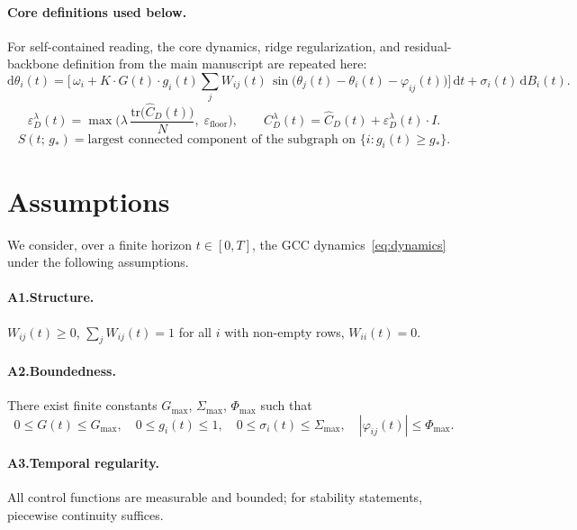 \documentclass[11pt,a4paper]{article}
\theoremstyle{plain}
\theoremstyle{definition}
\theoremstyle{remark}
\newcommand{\Gmax}{G_{\max}}
\begin{document}
\paragraph{Core definitions used below.}
For self-contained reading, the core dynamics, ridge regularization, and residual-backbone definition from the main manuscript are repeated here:
\begin{equation}
\label{eq:dynamics}
\mathrm{d}\theta_i(t)
= \biggl[\,\omega_i
+ K \cdot G(t) \cdot g_i(t) \sum_{j} W_{ij}(t)\,\sin\!\bigl(\theta_j(t) - \theta_i(t) - \varphi_{ij}(t)\bigr)
\biggr]\,\mathrm{d}t
+ \sigma_i(t)\,\mathrm{d}B_i(t).
\end{equation}
\begin{equation}
\label{eq:ridge}
\varepsilon_D^{\lambda}(t) =
\max\!\biggl(\lambda\,\frac{\mathrm{tr}\bigl(\hat{C}_D(t)\bigr)}{N},\;\varepsilon_{\mathrm{floor}}\biggr),
\qquad
C_D^{\lambda}(t) = \hat{C}_D(t) + \varepsilon_D^{\lambda}(t)\cdot I.
\end{equation}
\begin{equation}
\label{eq:backbone}
S(t;\,g_*) = \text{largest connected component of the subgraph on } \{i : g_i(t) \geq g_*\}.
\end{equation}


\section{Assumptions}
\label{app:voraussetzungen}

We consider, over a finite horizon $t \in [0,T]$, the GCC dynamics~\eqref{eq:dynamics} under the following assumptions.

\paragraph{A1.\;Structure.}
$W_{ij}(t) \geq 0$, \;\;$\sum_j W_{ij}(t) = 1$ for all $i$ with non-empty rows, \;\;$W_{ii}(t) = 0$.

\paragraph{A2.\;Boundedness.}
There exist finite constants $\Gmax$, $\Sigma_{\max}$, $\Phi_{\max}$ such that
\[
0 \leq G(t) \leq \Gmax, \quad
0 \leq g_i(t) \leq 1, \quad
0 \leq \sigma_i(t) \leq \Sigma_{\max}, \quad
|\varphi_{ij}(t)| \leq \Phi_{\max}.
\]

\paragraph{A3.\;Temporal regularity.}
All control functions are measurable and bounded; for stability statements, piecewise continuity suffices.
\end{document}
